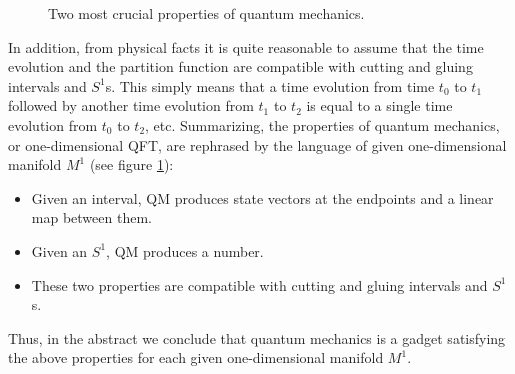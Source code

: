 \begin{figure}
\centering
  \subfloat[\label{}]{  %
    \begin{tikzpicture}[scale=1.0] %

        \draw[arrows=-latex] (0,0) -- (4,0) node[right] {time};
        \draw[thick, arrows=|-|] (0.8,0) node[above=0.2cm] (H0) {\normalsize $\mathcal{H}$} node[below=0.1] {$t_0$} -- (3.2,0) node[above=0.2cm] (H1) {\normalsize $\mathcal{H}$} node[below=0.1] {$t_1$};
        \draw[semithick, arrows=-to] (H0) to[bend left=30] node[above=0.2cm, pos=0.5] {\normalsize $e^{-(t_1 - t_0)H}$} (H1);

    \end{tikzpicture}
  }
  \qquad\qquad
  \subfloat[\label{}]{  %
    \begin{tikzpicture}[scale=1.0] %

        \draw[thick, arrows=|-] (1,0) node[right=0.1] {$t=0,\, \beta$} arc (0:360:1);
        \node at (0,0) {$S^1_{\beta}$};  %

        \node at (0.5,1.5) {\normalsize ${\rm Tr}_{\mathcal{H}} e^{-\beta H}$};

    \end{tikzpicture}
  }
  \caption{Two most crucial properties of quantum mechanics.}
  \label{fig:qm_two_properties}
\end{figure}


In addition, from physical facts it is quite reasonable to assume
that the time evolution and the partition function are compatible
with cutting and gluing intervals and $S^{1}$s. This simply means
that a time evolution from time $t_{0}$ to $t_{1}$ followed by
another time evolution from $t_{1}$ to $t_{2}$ is equal to a single
time evolution from $t_{0}$ to $t_{2}$, etc. Summarizing, the properties
of quantum mechanics, or one-dimensional QFT, are rephrased by
the language of given one-dimensional manifold $M^{1}$ (see figure \ref{fig:qm_two_properties}):
\begin{itemize}
  \item Given an interval, QM produces state vectors at the endpoints and a linear
map between them.
  \item Given an $S^{1}$, QM produces a number.
  \item These two properties are compatible with cutting and gluing intervals and $S^{1}$s.
\end{itemize}
Thus, in the abstract we conclude that quantum
mechanics is a gadget satisfying the above properties for each given
one-dimensional manifold $M^{1}$.

